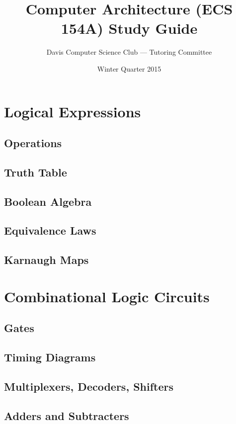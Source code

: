 \documentclass[11pt]{article}
\title{Computer Architecture (ECS 154A) Study Guide}
\author{Davis Computer Science Club --- Tutoring Committee}
\date{Winter Quarter 2015}
\begin{document}
\maketitle

\section{Logical Expressions}

\subsection{Operations}

\subsection{Truth Table}

\subsection{Boolean Algebra}

\subsection{Equivalence Laws}

\subsection{Karnaugh Maps}

\section{Combinational Logic Circuits}

\subsection{Gates}

\subsection{Timing Diagrams}

\subsection{Multiplexers, Decoders, Shifters}

\subsection{Adders and Subtracters}
\end{document}
